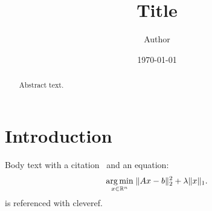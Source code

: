 \documentclass[11pt]{article}
\title{Title}
\author{Author}
\date{\today}
\newcommand{\R}{\mathbb{R}}
\DeclareMathOperator*{\argmin}{arg\,min}
\DeclarePairedDelimiter{\norm}{\lVert}{\rVert}
\theoremstyle{plain}
\theoremstyle{definition}
\begin{document}
\maketitle

\begin{abstract}
Abstract text.
\end{abstract}

\section{Introduction}\label{sec:intro}

Body text with a citation~\autocite{knuth1984literate} and an equation:
\begin{equation}\label{eq:main}
  \argmin_{x \in \R^n} \; \norm{Ax - b}_2^2 + \lambda \norm{x}_1 .
\end{equation}
 is referenced with cleveref.

\printbibliography[heading=bibintoc]
\end{document}
